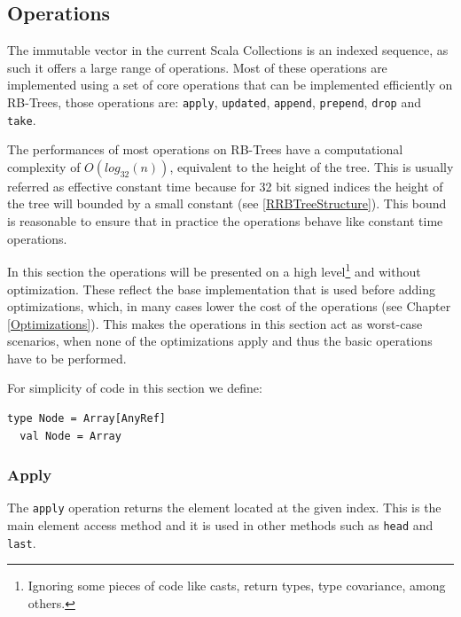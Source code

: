 \subsection{Operations}
\label{Operations}
The immutable vector in the current Scala Collections is an indexed sequence, as such it offers a large range of operations. Most of these operations are implemented using a set of core operations that can be implemented efficiently on RB-Trees, those operations are: \texttt{apply}, \texttt{updated}, \texttt{append}, \texttt{prepend}, \texttt{drop} and \texttt{take}. 

The performances of most operations on RB-Trees have a computational complexity of $O(log_{32}(n))$, equivalent to the height of the tree. This is usually referred as effective constant time because for 32 bit signed indices the height of the tree will bounded by a small constant (see \ref{RRBTreeStructure}). This bound is reasonable to ensure that in practice the operations behave like constant time operations.  
 
In this section the operations will be presented on a high level\footnote{Ignoring some pieces of code like casts, return types, type covariance, among others.} and without optimization. These reflect the base implementation that is used before adding optimizations, which, in many cases lower the cost of the operations (see Chapter \ref{Optimizations}). This makes the operations in this section act as worst-case scenarios, when none of the optimizations apply and thus the basic operations have to be performed.

For simplicity of code in this section we define:
\begin{lstlisting}[frame=single]
  type Node = Array[AnyRef]
  val Node = Array
\end{lstlisting}



\subsubsection{Apply}
\label{sec:apply}
The \texttt{apply} operation returns the element located at the given index. This is the main element access method and it is used in other methods such as \texttt{head} and \texttt{last}. 

